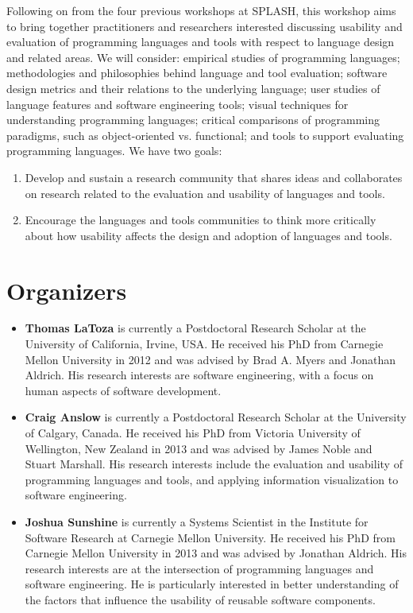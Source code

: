 \documentclass{sigplanconf}
\begin{document}
Following on from the four previous workshops at SPLASH, this workshop aims to bring together practitioners and
researchers interested discussing usability and evaluation of
programming languages and tools with respect to language design and
related areas. We will consider: empirical studies of programming
languages; methodologies and philosophies behind language and tool
evaluation; software design metrics and their relations to the
underlying language; user studies of language features and software
engineering tools; visual techniques for understanding programming
languages; critical comparisons of programming paradigms, such as
object-oriented vs. functional; and tools to support evaluating
programming languages. We have two goals:

\begin{enumerate}
  \item 
Develop and sustain a research community that shares ideas and collaborates on 
research related to the evaluation and usability of languages and tools.
\item
Encourage the languages and tools communities to think more critically
about how usability affects the  design and adoption of languages and tools.
\end{enumerate}


\section{Organizers}

\begin{itemize}
  
\item \textbf{Thomas LaToza} is currently a Postdoctoral Research Scholar at the University of California, Irvine, USA.  He received his PhD from Carnegie Mellon University in 2012 and was advised by Brad A. Myers and Jonathan Aldrich. His research interests are software engineering, with a focus on human aspects of software development. 

 \item \textbf{Craig Anslow} is currently a Postdoctoral Research Scholar at the University of Calgary, Canada. He received his PhD from Victoria University of Wellington, New Zealand in 2013 and was advised by James Noble and Stuart Marshall. His research interests include the evaluation and usability of programming languages and tools, and applying information visualization to software engineering.
  
\item \textbf{Joshua Sunshine} is currently a Systems Scientist in the Institute for Software Research at Carnegie Mellon University.  He received his PhD from Carnegie Mellon University in 2013 and was advised by Jonathan Aldrich. His research interests are at the intersection of programming languages and software engineering. He is particularly interested in better understanding of the factors that influence the usability of reusable software components.
  
\end{itemize}
\end{document}
